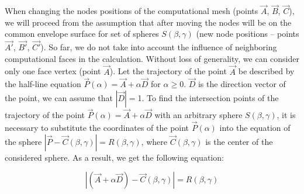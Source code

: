 \documentclass[
11pt,%
tightenlines,%
twoside,%
onecolumn,%
nofloats,%
nobibnotes,%
nofootinbib,%
superscriptaddress,%
noshowpacs,%
centertags]%
{revtex4-2}
\begin{document}
When changing the nodes positions of the computational mesh (points $\vec{A}$, $\vec{B}$, $\vec{C}$), we will proceed from the assumption that after moving the nodes will be on the common envelope surface for set of spheres $ S(\beta, \gamma)$ (new node positions -- points $\vec{A'}$, $\vec{B'}$, $\vec{C'}$).
So far, we do not take into account the influence of neighboring computational faces in the calculation.
Without loss of generality, we can consider only one face vertex (point $\vec{A}$).
Let the trajectory of the point $\vec{A}$ be described by the half-line equation $\vec{P}(\alpha) = \vec{A} + \alpha \vec{D}$ for $\alpha \ge 0$.
$\vec{D}$ is the direction vector of the point, we can assume that $|\vec{D}| = $1.
To find the intersection points of the trajectory of the point $\vec{P}(\alpha) = \vec{A} + \alpha \vec{D}$ with an arbitrary sphere $S(\beta, \gamma)$, it is necessary to substitute the coordinates of the point $\vec{P}(\alpha)$ into the equation of the sphere $|\vec{P} - \vec{C}(\beta, \gamma)| = R(\beta, \gamma)$, where $\vec{C}(\beta, \gamma)$ is the center of the considered sphere.
As a result, we get the following equation:

\begin{equation}\label{eqn:intersect}
|(\vec{A} + \alpha \vec{D}) - \vec{C}(\beta, \gamma)| = R(\beta, \gamma)
\end{equation}
\end{document}
